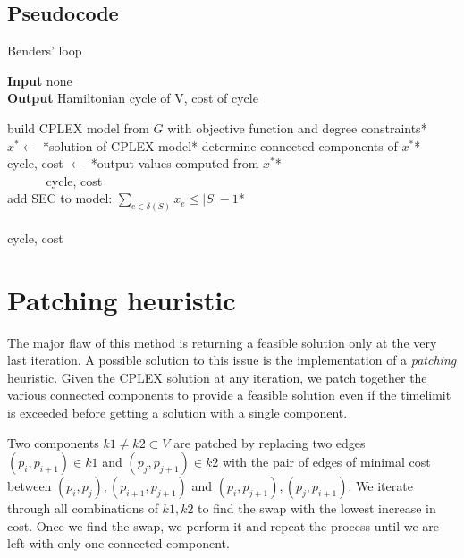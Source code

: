 \subsection{Pseudocode}
\begin{algorithm}[h]
    \caption{Benders' loop}

    \textbf{Input} none\\
    \textbf{Output} Hamiltonian cycle of V, cost of cycle\\
    \begin{algorithmic}

        \State *build CPLEX model from $G$ with objective function and degree constraints*\\
            \State $x^* \gets$ *solution of CPLEX model*
            \State *determine connected components of $x^*$*\\

                \State cycle, cost $\gets$ *output values computed from $x^*$*\\
                $\quad\;\;\quad\;\;$\Return cycle, cost
            \EndIf\\

                \State *add SEC to model: $\sum_{e\in\delta(S)}x_e\leq|S|-1$*
            \EndFor
        \EndWhile\\\\

        \Return cycle, cost

    \end{algorithmic}
\end{algorithm}
\FloatBarrier

\section{Patching heuristic}
The major flaw of this method is returning a feasible solution only at the very last iteration. A possible solution to this issue is the implementation of a \textit{patching} heuristic. Given the CPLEX solution at any iteration, we patch together the various connected components to provide a feasible solution even if the timelimit is exceeded before getting a solution with a single component.

Two components $k1\neq k2\subset V$ are patched by replacing two edges $(p_i, p_{i+1})\in k1$ and $(p_j, p_{j+1})\in k2$ with the pair of edges of minimal cost between $(p_i,p_j), (p_{i+1},p_{j+1})$ and $(p_i,p_{j+1}),(p_j, p_{i+1})$. We iterate through all combinations of $k1,k2$ to find the swap with the lowest increase in cost. Once we find the swap, we perform it and repeat the process until we are left with only one connected component.


